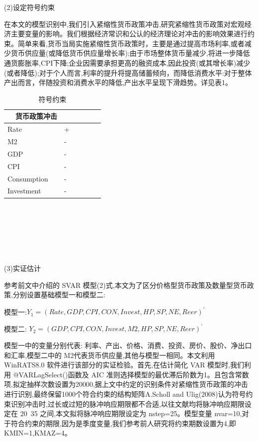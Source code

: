 \documentclass{ijclclp}
\begin{document}
(2)设定符号约束

在本文的模型识别中,我们引入紧缩性货币政策冲击,研究紧缩性货币政策对宏观经济主要变量的影响。我们根据经济常识和公认的经济理论对冲击的影响效果进行约束。简单来看,货币当局实施紧缩性货币政策时，主要是通过提高市场利率,或者减少货币供应量(或降低货币供应量增长率);由于市场整体货币量减少,将进一步降低通货膨胀率,CPI下降;企业因需要承担更高的融资成本,因此投资(或其增长率)减少(或者降低);对于个人而言,利率的提升将提高储蓄倾向，而降低消费水平:对于整体产出而言，伴随投资和消费水平的降低,产出水平呈现下滑趋势。详见表1。

\begin{table}[h]
    \centering
    \begin{tabular}{lllrrr}
        \toprule
        \ \ 货币政策冲击\\
        \midrule
        Rate & + \\
        M2 & - \\
        GDP & - \\
        CPI & - \\
        Consumption & - \\
        Investment & - \\
        \bottomrule
    \end{tabular}
    \caption{符号约束}
\end{table}
\textbf{}\\\\\\\\\\\\
(3)实证估计

参考前文中介绍的 SVAR 模型(2)式,本文为了区分价格型货币政策及数量型货币政策,分别设置基础模型一和模型二:

模型一:$Y_1=(Rate, GDP,CPI,CON,Invest,HP,SP,NE, Reer)^'$

模型二: $Y_2=(GDP, CPI, CON, Invest,M2,HP,SP,NE, Reer)^'$

模型一中的变量分别代表: 利率、产出、价格、消费、投资、房价、股价、净出口和汇率,模型二中的 M2代表货币供应量,其他与模型一相同。本文利用 WinRATS8.0 软件进行该部分的实证检验。首先,在估计简化 VAR 模型时,我们利用 @VARLagSelect()函数及 AIC 准则选择模型的最优滞后阶数为1。且包含常数项,拟定抽样次数设置为20000,据上文中约定的识别条件对紧缩性货币政策的冲击进行识别,最终保留1000个符合约束的结构矩阵A.Scholl and Ulig(2008)认为符号约束识别冲击时,过长或过短的脉冲响应期限都不合适,以往文献均将脉冲响应期限设定在 20~35 之间,本文拟将脉冲响应期限设定为 nstep=25。模型变量 nvar=10,对于符合约束的期限,因为是季度变量,我们参考前人研究将约束期数设置为4,即 KMIN=1,KMAZ=4。
\end{document}
